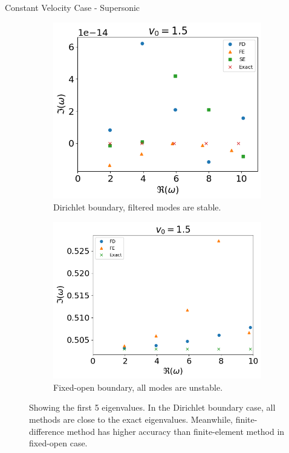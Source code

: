 \begin{frame}{Constant Velocity Case - Supersonic}
  \begin{figure}[H]
    \begin{subfigure}{0.45\textwidth}
      \centering
      \includegraphics[width=0.9\linewidth]{../../thesis/img/numerical-experiments/fixed-fixed/constant-v-v0=1.5}
      \caption{Dirichlet boundary, filtered modes are stable.}
    \end{subfigure}%
    \begin{subfigure}{0.45\textwidth}
      \includegraphics[width=\linewidth]{../../thesis/img/numerical-experiments/fixed-open/constant-v-v0=1.5}
      \caption{Fixed-open boundary, all modes are unstable.}
    \end{subfigure}
    \caption{Showing the first 5 eigenvalues. In the Dirichlet boundary case, all methods are close to the exact eigenvalues. Meanwhile, finite-difference method has higher accuracy than finite-element method in fixed-open case.}
    \label{fig:constant-v-fixed-open}
  \end{figure}
\end{frame}

